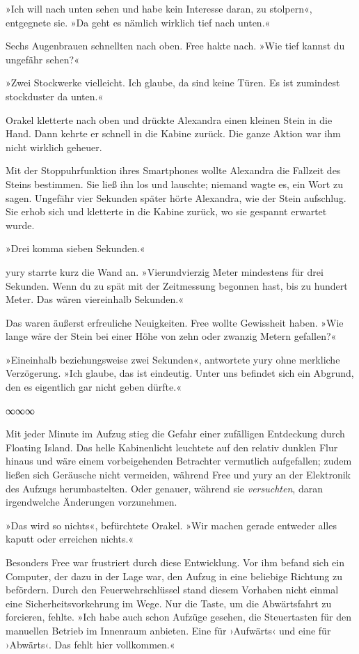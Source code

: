 »Ich will nach unten sehen und habe kein Interesse daran, zu stolpern«, entgegnete sie. »Da geht es nämlich wirklich tief nach unten.«

Sechs Augenbrauen schnellten nach oben. Free hakte nach. »Wie tief kannst du ungefähr sehen?«

»Zwei Stockwerke vielleicht. Ich glaube, da sind keine Türen. Es ist zumindest stockduster da unten.«

Orakel kletterte nach oben und drückte Alexandra einen kleinen Stein in die Hand. Dann kehrte er schnell in die Kabine zurück. Die ganze Aktion war ihm nicht wirklich geheuer.

Mit der Stoppuhrfunktion ihres Smartphones wollte Alexandra die Fallzeit des Steins bestimmen. Sie ließ ihn los und lauschte; niemand wagte es, ein Wort zu sagen. Ungefähr vier Sekunden später hörte Alexandra, wie der Stein aufschlug. Sie erhob sich und kletterte in die Kabine zurück, wo sie gespannt erwartet wurde.

»Drei komma sieben Sekunden.«

yury starrte kurz die Wand an. »Vierundvierzig Meter mindestens für drei Sekunden. Wenn du zu spät mit der Zeitmessung begonnen hast, bis zu hundert Meter. Das wären viereinhalb Sekunden.«

Das waren äußerst erfreuliche Neuigkeiten. Free wollte Gewissheit haben. »Wie lange wäre der Stein bei einer Höhe von zehn oder zwanzig Metern gefallen?«

»Eineinhalb beziehungsweise zwei Sekunden«, antwortete yury ohne merkliche Verzögerung. »Ich glaube, das ist eindeutig. Unter uns befindet sich ein Abgrund, den es eigentlich gar nicht geben dürfte.«

\begin{center}
∞∞∞
\end{center}

Mit jeder Minute im Aufzug stieg die Gefahr einer zufälligen Entdeckung durch Floating Island. Das helle Kabinenlicht leuchtete auf den relativ dunklen Flur hinaus und wäre einem vorbeigehenden Betrachter vermutlich aufgefallen; zudem ließen sich Geräusche nicht vermeiden, während Free und yury an der Elektronik des Aufzugs herumbastelten. Oder genauer, während sie \emph{versuchten}, daran irgendwelche Änderungen vorzunehmen.

»Das wird so nichts«, befürchtete Orakel. »Wir machen gerade entweder alles kaputt oder erreichen nichts.«

Besonders Free war frustriert durch diese Entwicklung. Vor ihm befand sich ein Computer, der dazu in der Lage war, den Aufzug in eine beliebige Richtung zu befördern. Durch den Feuerwehrschlüssel stand diesem Vorhaben nicht einmal eine Sicherheitsvorkehrung im Wege. Nur die Taste, um die Abwärtsfahrt zu forcieren, fehlte. »Ich habe auch schon Aufzüge gesehen, die Steuertasten für den manuellen Betrieb im Innenraum anbieten. Eine für ›Aufwärts‹ und eine für ›Abwärts‹. Das fehlt hier vollkommen.«

